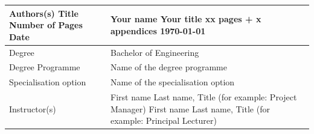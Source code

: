 \documentclass[11pt,a4paper,oneside]{memoir}
\begin{document}
\pagestyle{myheadings}
\markright{}




\pagestyle{empty}
\begin{tabular}{ | p{} | p{} |}
    \hline
    Authors(s) \newline
    Title \newline\newline 
    Number of Pages \newline
    Date
    & 
    Your name \newline %
    Your title \newline\newline %
    xx pages + x appendices \newline %
    \today		
    \\ \hline
    Degree & Bachelor of Engineering
    \\ \hline
    Degree Programme & Name of the degree programme		
    \\ \hline
    Specialisation option & Name of the specialisation option
    \\ \hline
    Instructor(s) & 
    First name Last name, Title (for example: Project Manager) \newline
    First name Last name, Title (for example: Principal Lecturer)
    \\ \hline
\end{tabular}
\clearpage


\pagestyle{empty} %
\tableofcontents*
\pagestyle{empty} %
\clearpage
\pagestyle{plain}
\end{document}
